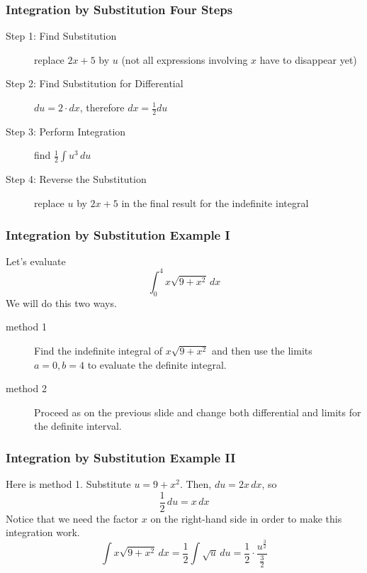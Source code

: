 \documentclass[xcolor=dvipsnames]{beamer}
\begin{document}
\begin{frame}
  \frametitle{Integration by Substitution Four Steps}
  \begin{description}
  \item[Step 1: Find Substitution] replace $2x+5$ by $u$ (not all
    expressions involving $x$ have to disappear yet)
  \item[Step 2: Find Substitution for Differential]
    $du=2\cdot{}dx$, therefore $dx=\frac{1}{2}du$
  \item[Step 3: Perform Integration] find $\frac{1}{2}\int{}u^{3}\,du$
  \item[Step 4: Reverse the Substitution] replace $u$ by $2x+5$ in
    the final result for the indefinite integral
  \end{description}
\end{frame}

\begin{frame}
  \frametitle{Integration by Substitution Example I}
   Let's evaluate
  \begin{equation}
    \label{eq:eenoophu}
   \int_{0}^{4}x\sqrt{9+x^{2}}\,dx 
  \end{equation}
  We will do this two ways. 
  \begin{description}
  \item[method 1] Find the indefinite integral of $x\sqrt{9+x^{2}}$
    and then use the limits $a=0,b=4$ to evaluate the definite
    integral.
  \item[method 2] Proceed as on the previous slide and change both
    differential \alert{and} limits for the definite interval.
  \end{description}
\end{frame}

\begin{frame}
  \frametitle{Integration by Substitution Example II}
  Here is method 1. Substitute $u=9+x^{2}$. Then, $du=2x\,dx$, so
\begin{equation}
  \label{eq:iachuejo}
  \frac{1}{2}\,du=x\,dx
\end{equation}
Notice that we need the factor $x$ on the right-hand side in order to
make this integration work.
\begin{equation}
  \label{eq:diacheiv}
  \int{}x\sqrt{9+x^{2}}\,dx=\frac{1}{2}\int{}\sqrt{u}\,du=\frac{1}{2}\cdot\frac{u^{\frac{3}{2}}}{\frac{3}{2}}
\end{equation}
\end{frame}
\end{document}
